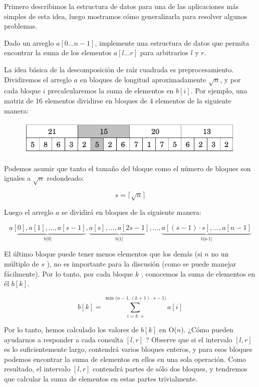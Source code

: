 Primero describimos la estructura de datos para una de las aplicaciones más simples de esta idea, luego mostramos cómo generalizarla para resolver algunos problemas.

Dado un arreglo $a[0 \dots n-1]$, implemente una estructura de datos que permita encontrar la suma de los elementos $a[l \dots r]$  para arbitrarios $l$ y $r$.

La idea básica de  la descomposición de raíz cuadrada es preprocesamiento. Dividiremos el arreglo $a$ en bloques de longitud aproximadamente $\sqrt n$, y por cada bloque $i$ precalcularemos la suma de elementos en $b[i]$. Por ejemplo, una matriz de 16 elementos dividirse en bloques de 4 elementos de la siguiente manera:

\begin{figure}[h!]
	\centering
	\includegraphics[width=0.7\linewidth]{img/srt_descomposition1}
	\label{fig:srtdescomposition1}
\end{figure}


Podemos asumir que tanto el tamaño del bloque como el número de bloques son iguales a $\sqrt n$  redondeado:

$$ s = \lceil \sqrt n \rceil $$

Luego el arreglo $a$ se dividirá en bloques de la siguiente manera:

$$ \underbrace{a[0], a[1], \dots, a[s-1]}_{\text{b[0]}}, \underbrace{a[s], \dots, a[2s-1]}_{\text{b[1]}}, \dots, \underbrace{a[(s-1) \cdot s], \dots, a[n-1]}_{\text{b[s-1]}} $$

El último bloque puede tener menos elementos que los demás (si $n$ no un múltiplo de $s$ ), no es importante para la discusión (como se puede manejar fácilmente). Por lo tanto, por cada bloque $k$ , conocemos la suma de elementos en él $b[k]$.

$$ b[k] = \sum\limits_{i=k\cdot s}^{\min {(n-1,(k+1)\cdot s - 1})} a[i] $$

Por lo tanto, hemos calculado los valores de $b[k]$ en O($n$). ¿Cómo pueden ayudarnos a responder a cada consulta $[l,r]$ ? Observe que si el intervalo $[l, r]$ es lo suficientemente largo, contendrá varios bloques enteros, y para esos bloques podemos encontrar la suma de elementos en ellos en una sola operación. Como resultado, el intervalo $[l, r]$ contendrá partes de sólo dos bloques, y tendremos que calcular la suma de elementos en estas partes trivialmente.


